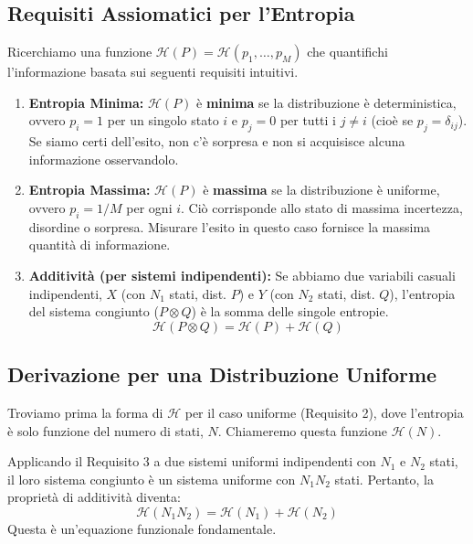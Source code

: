 \newpage 
\subsection{Requisiti Assiomatici per l'Entropia}

Ricerchiamo una funzione $\mathcal{H}(P) = \mathcal{H}(p_1, \dots, p_M)$ che quantifichi l'informazione basata sui seguenti requisiti intuitivi.

\begin{enumerate}
    \item \textbf{Entropia Minima:} $\mathcal{H}(P)$ è \textbf{minima} se la distribuzione è deterministica, ovvero $p_i = 1$ per un singolo stato $i$ e $p_j = 0$ per tutti i $j \neq i$ (cioè se $p_j = \delta_{ij}$). Se siamo certi dell'esito, non c'è sorpresa e non si acquisisce alcuna informazione osservandolo.

    \item \textbf{Entropia Massima:} \label{requirement 2} $\mathcal{H}(P)$ è \textbf{massima} se la distribuzione è uniforme, ovvero $p_i = 1/M$ per ogni $i$. Ciò corrisponde allo stato di massima incertezza, disordine o sorpresa. Misurare l'esito in questo caso fornisce la massima quantità di informazione.

    \item \textbf{Additività (per sistemi indipendenti):} Se abbiamo due variabili casuali indipendenti, $X$ (con $N_1$ stati, dist. $P$) e $Y$ (con $N_2$ stati, dist. $Q$), l'entropia del sistema congiunto ($P \otimes Q$) è la somma delle singole entropie.
    \begin{equation}
        \mathcal{H}(P \otimes Q) = \mathcal{H}(P) + \mathcal{H}(Q)
        \label{eq:additivity_axiom}
    \end{equation}
\end{enumerate}

\subsection{Derivazione per una Distribuzione Uniforme}

Troviamo prima la forma di $\mathcal{H}$ per il caso uniforme (Requisito 2), dove l'entropia è solo funzione del numero di stati, $N$. Chiameremo questa funzione $\mathcal{H}(N)$.

Applicando il Requisito 3 a due sistemi uniformi indipendenti con $N_1$ e $N_2$ stati, il loro sistema congiunto è un sistema uniforme con $N_1 N_2$ stati.
Pertanto, la proprietà di additività diventa:
\begin{equation}
    \mathcal{H}(N_1 N_2) = \mathcal{H}(N_1) + \mathcal{H}(N_2)
    \label{eq:additivity_functional}
\end{equation}
Questa è un'equazione funzionale fondamentale.

